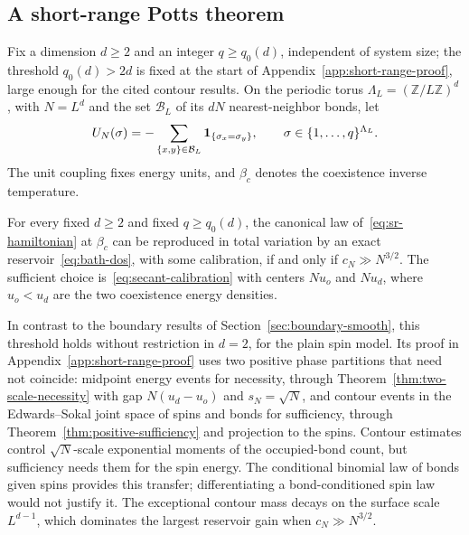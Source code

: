 \subsection{A short-range Potts theorem}
\label{subsec:short-range}

Fix a dimension $d\ge2$ and an integer $q\ge q_0(d)$, independent of
system size; the threshold $q_0(d)>2d$ is fixed at the start of
Appendix~\ref{app:short-range-proof}, large enough for the cited
contour results. On the periodic torus
$\Lambda_L=(\mathbb Z/L\mathbb Z)^d$, with $N=L^d$ and the set
$\mathcal B_L$ of its $dN$ nearest-neighbor bonds, let
\begin{equation}
 U_N(\sigma)=-\sum_{\{x,y\}\in\mathcal B_L}
                   \mathbf 1_{\{\sigma_x=\sigma_y\}},
 \qquad \sigma\in\{1,\ldots,q\}^{\Lambda_L}.
 \label{eq:sr-hamiltonian}
\end{equation}
The unit coupling fixes energy units, and $\beta_c$ denotes the
coexistence inverse temperature.

\begin{theorem}
\label{thm:sr-bath}
For every fixed $d\ge2$ and fixed $q\ge q_0(d)$, the canonical
law of~\eqref{eq:sr-hamiltonian} at $\beta_c$ can be reproduced in
total variation by an exact reservoir~\eqref{eq:bath-dos}, with some
calibration, if and only if $c_N\gg N^{3/2}$. The sufficient
choice is~\eqref{eq:secant-calibration} with centers $Nu_o$ and $Nu_d$,
where $u_o<u_d$ are the two coexistence energy densities.
\end{theorem}

In contrast to the boundary results of
Section~\ref{sec:boundary-smooth}, this threshold holds without
restriction in $d=2$, for the plain spin model. Its proof in
Appendix~\ref{app:short-range-proof} uses two positive phase
partitions that need not coincide: midpoint energy events for
necessity, through Theorem~\ref{thm:two-scale-necessity} with gap
$N(u_d-u_o)$ and $s_N=\sqrt N$, and contour events in the
Edwards--Sokal joint space of spins and bonds for sufficiency, through
Theorem~\ref{thm:positive-sufficiency} and projection to the spins.
Contour estimates control $\sqrt N$-scale exponential moments of the
occupied-bond count, but sufficiency needs them for the spin energy.
The conditional binomial law of bonds given spins provides this
transfer; differentiating a bond-conditioned spin law would not justify
it. The exceptional contour mass decays on the surface scale
$L^{d-1}$, which dominates the largest reservoir gain when
$c_N\gg N^{3/2}$.
